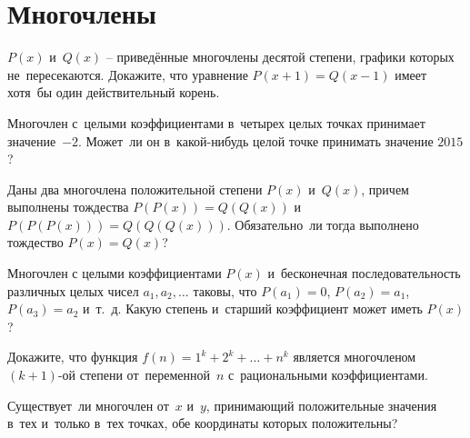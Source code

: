 
\section*{Многочлены}


\begin{problems}

\item
$P(x)$ и~$Q(x)$ -- приведённые многочлены десятой степени, графики которых
не~пересекаются.
Докажите, что уравнение $P(x + 1) = Q(x - 1)$ имеет хотя~бы один действительный
корень.

\item
Многочлен с~целыми коэффициентами в~четырех целых точках принимает
значение~$-2$.
Может~ли он в~какой-нибудь целой точке принимать значение $2015$?


\item
Даны два многочлена положительной степени $P(x)$ и~$Q(x)$, причем выполнены
тождества $P(P(x)) = Q(Q(x))$ и~$P(P(P(x))) = Q(Q(Q(x)))$.
Обязательно~ли тогда выполнено тождество $P(x) = Q(x)$?

\item
Многочлен с целыми коэффициентами $P(x)$ и~бесконечная последовательность
различных целых чисел $a_1, a_2, \ldots$ таковы, что
$P(a_1) = 0$, $P(a_2) = a_1$, $P(a_3) = a_2$ и~т.~д.
Какую степень и~старший коэффициент может иметь $P(x)$?

\item
Докажите, что функция $f(n) = 1^k + 2^k + \ldots + n^k$ является многочленом
$(k + 1)$-ой степени от~переменной~$n$ с~рациональными коэффициентами.


\item
Существует~ли многочлен от~$x$ и~$y$, принимающий положительные значения в~тех
и~только в~тех точках, обе координаты которых положительны?


\end{problems}
